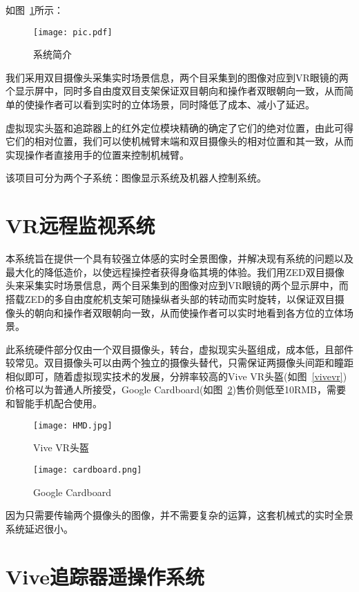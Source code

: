 如图~\ref{pic}所示：

\begin{figure}[htbp]
\small
\centering
\texttt{[image: pic.pdf]}
\caption{系统简介} 
\label{pic}
\end{figure}




我们采用双目摄像头采集实时场景信息，两个目采集到的图像对应到VR眼镜的两个显示屏中，同时多自由度双目支架保证双目朝向和操作者双眼朝向一致，从而简单的使操作者可以看到实时的立体场景，同时降低了成本、减小了延迟。

虚拟现实头盔和追踪器上的红外定位模块精确的确定了它们的绝对位置，由此可得它们的相对位置，我们可以使机械臂末端和双目摄像头的相对位置和其一致，从而实现操作者直接用手的位置来控制机械臂。


该项目可分为两个子系统：图像显示系统及机器人控制系统。
	
	\section{VR远程监视系统}
本系统旨在提供一个具有较强立体感的实时全景图像，并解决现有系统的问题以及最大化的降低造价，以使远程操控者获得身临其境的体验。我们用ZED双目摄像头来采集实时场景信息，两个目采集到的图像对应到VR眼镜的两个显示屏中，而搭载ZED的多自由度舵机支架可随操纵者头部的转动而实时旋转，以保证双目摄像头的朝向和操作者双眼朝向一致，从而使操作者可以实时地看到各方位的立体场景。
	
此系统硬件部分仅由一个双目摄像头，转台，虚拟现实头盔组成，成本低，且部件较常见。双目摄像头可以由两个独立的摄像头替代，只需保证两摄像头间距和瞳距相似即可，随着虚拟现实技术的发展，分辨率较高的Vive VR头盔(如图~\ref{vivevr})价格可以为普通人所接受，Google Cardboard(如图~\ref{cardb})售价则低至10RMB，需要和智能手机配合使用。
\begin{figure}
\begin{minipage}{0.48\textwidth}
  \centering
  \texttt{[image: HMD.jpg]}
  \caption{Vive VR头盔}
  \label{vivevr}
\end{minipage}\hfill
\begin{minipage}{0.48\textwidth}
  \centering
  \texttt{[image: cardboard.png]}
  \caption{Google Cardboard}
  \label{cardb}
\end{minipage}
\end{figure}

因为只需要传输两个摄像头的图像，并不需要复杂的运算，这套机械式的实时全景系统延迟很小。

\section{Vive追踪器遥操作系统}

